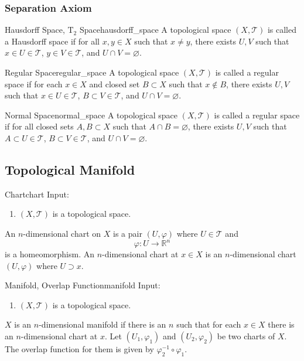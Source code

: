 \documentclass{article}
\begin{document}
\subsubsection{Separation Axiom}

\begin{definition}{Hausdorff Space, $\mathrm{T}_2$ Space}{hausdorff_space}
    A topological space $(X,\mathcal{T})$ is called a Hausdorff space if for all $x,y\in X$ such that $x\neq y$, there exists $U,V$ such that $x\in U \in \mathcal{T}$, $y\in V\in \mathcal{T}$, and $U\cap V = \varnothing$.
\end{definition}

\begin{definition}{Regular Space}{regular_space}
    A topological space $(X,\mathcal{T})$ is called a regular space if for each $x\in X$ and closed set $B\subset X$ such that $x\notin B$, there exists $U,V$ such that $x\in U \in \mathcal{T}$, $B\subset V\in \mathcal{T}$, and $U\cap V = \varnothing$.
\end{definition}

\begin{definition}{Normal Space}{normal_space}
    A topological space $(X,\mathcal{T})$ is called a regular space if for all closed sets $A,B\subset X$ such that $A\cap B = \varnothing$, there exists $U,V$ such that $A\subset U \in \mathcal{T}$, $B\subset V\in \mathcal{T}$, and $U\cap V = \varnothing$.
\end{definition}

\subsection{Topological Manifold}

\begin{definition}{Chart}{chart}
    Input:
    \begin{enumerate}
        \item $(X,\mathcal{T})$ is a topological space.
    \end{enumerate}
    An $n$-dimensional chart on $X$ is a pair $(U,\varphi)$ where $U\in\mathcal{T}$ and
    \[ \varphi: U \rightarrow \mathbb{R}^n \]
    is a homeomorphism.
    An $n$-dimensional chart at $x\in X$ is an $n$-dimensional chart $(U,\varphi)$ where $U\supset x$.
\end{definition}

\begin{definition}{Manifold, Overlap Function}{manifold}
    Input:
    \begin{enumerate}
        \item $(X,\mathcal{T})$ is a topological space.
    \end{enumerate}
    $X$ is an $n$-dimensional manifold if there is an $n$ such that for each $x\in X$ there is an $n$-dimensional chart at $x$.
    Let $(U_1,\varphi_1)$ and $(U_2,\varphi_2)$ be two charts of $X$.
    The overlap function for them is given by $\varphi_2^{-1}\circ \varphi_1$.
\end{definition}
\end{document}
